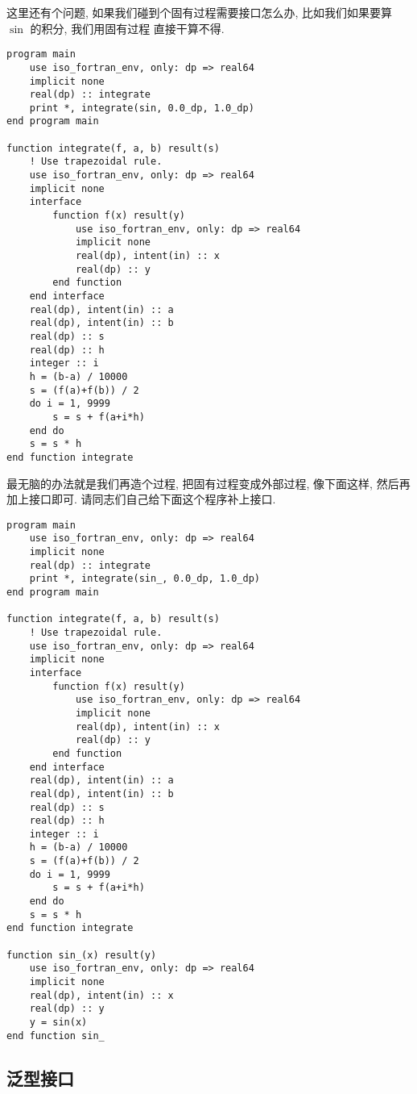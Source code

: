 这里还有个问题, 如果我们碰到个固有过程需要接口怎么办, 比如我们如果要算 $ \sin $ 的积分, 我们用固有过程  直接干算不得.
\begin{lstlisting} 
program main
    use iso_fortran_env, only: dp => real64
    implicit none
    real(dp) :: integrate
    print *, integrate(sin, 0.0_dp, 1.0_dp)
end program main

function integrate(f, a, b) result(s)
    ! Use trapezoidal rule.
    use iso_fortran_env, only: dp => real64
    implicit none
    interface
        function f(x) result(y)
            use iso_fortran_env, only: dp => real64
            implicit none
            real(dp), intent(in) :: x
            real(dp) :: y
        end function
    end interface
    real(dp), intent(in) :: a
    real(dp), intent(in) :: b
    real(dp) :: s
    real(dp) :: h
    integer :: i
    h = (b-a) / 10000
    s = (f(a)+f(b)) / 2
    do i = 1, 9999
        s = s + f(a+i*h)
    end do
    s = s * h
end function integrate
\end{lstlisting} 
最无脑的办法就是我们再造个过程, 把固有过程变成外部过程, 像下面这样, 然后再加上接口即可. 请同志们自己给下面这个程序补上接口. 
\begin{lstlisting} 
program main
    use iso_fortran_env, only: dp => real64
    implicit none
    real(dp) :: integrate
    print *, integrate(sin_, 0.0_dp, 1.0_dp)
end program main

function integrate(f, a, b) result(s)
    ! Use trapezoidal rule.
    use iso_fortran_env, only: dp => real64
    implicit none
    interface
        function f(x) result(y)
            use iso_fortran_env, only: dp => real64
            implicit none
            real(dp), intent(in) :: x
            real(dp) :: y
        end function
    end interface
    real(dp), intent(in) :: a
    real(dp), intent(in) :: b
    real(dp) :: s
    real(dp) :: h
    integer :: i
    h = (b-a) / 10000
    s = (f(a)+f(b)) / 2
    do i = 1, 9999
        s = s + f(a+i*h)
    end do
    s = s * h
end function integrate

function sin_(x) result(y)
    use iso_fortran_env, only: dp => real64
    implicit none
    real(dp), intent(in) :: x
    real(dp) :: y
    y = sin(x)
end function sin_
\end{lstlisting} 

\subsection{泛型接口} 

